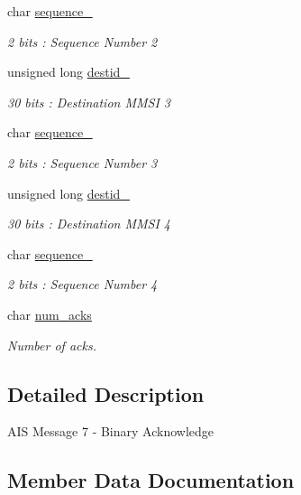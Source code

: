 \begin{DoxyCompactItemize}
char \mbox{\hyperlink{structaismsg__7_a9b5664a5a889a241b5d5ca0aeaadd461}{sequence\+\_}}
\begin{DoxyCompactList}\small\item\em 2 bits \+: Sequence Number 2 \end{DoxyCompactList}\item 
unsigned long \mbox{\hyperlink{structaismsg__7_a3c4e1ad129261cf18d641065030ae771}{destid\+\_}}
\begin{DoxyCompactList}\small\item\em 30 bits \+: Destination M\+M\+SI 3 \end{DoxyCompactList}\item 
char \mbox{\hyperlink{structaismsg__7_a302c1d225ebc7a67819bc70946bad3b0}{sequence\+\_}}
\begin{DoxyCompactList}\small\item\em 2 bits \+: Sequence Number 3 \end{DoxyCompactList}\item 
unsigned long \mbox{\hyperlink{structaismsg__7_abe978f370fb09a268b0207e57c14cb34}{destid\+\_}}
\begin{DoxyCompactList}\small\item\em 30 bits \+: Destination M\+M\+SI 4 \end{DoxyCompactList}\item 
char \mbox{\hyperlink{structaismsg__7_a341ddae57ee4349bff3215a9acf846ec}{sequence\+\_}}
\begin{DoxyCompactList}\small\item\em 2 bits \+: Sequence Number 4 \end{DoxyCompactList}\item 
char \mbox{\hyperlink{structaismsg__7_a44e987a476522c9368b108ae031dd9ab}{num\+\_\+acks}}
\begin{DoxyCompactList}\small\item\em Number of acks. \end{DoxyCompactList}\end{DoxyCompactItemize}


\subsection{Detailed Description}
A\+IS Message 7 -\/ Binary Acknowledge 

\subsection{Member Data Documentation}
\mbox{\label{structaismsg__7_aa471618b24cce4644dd314bdc197742c}} 
